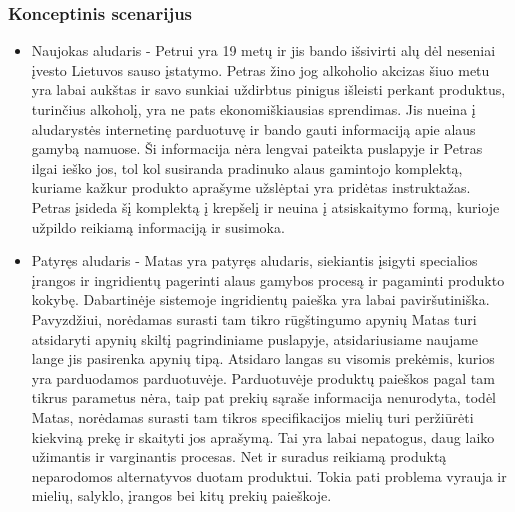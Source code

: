 \documentclass[oneside]{VUMIFPSkursinis}
\begin{document}
		\subsubsection{Konceptinis scenarijus}
			\begin{itemize}
				\item{Naujokas aludaris - Petrui yra 19 metų ir jis bando išsivirti alų dėl neseniai įvesto Lietuvos sauso įstatymo.
					Petras žino jog alkoholio akcizas šiuo metu yra labai aukštas ir savo sunkiai uždirbtus pinigus išleisti perkant produktus, turinčius alkoholį, yra ne pats ekonomiškiausias sprendimas.
					Jis nueina į aludarystės internetinę parduotuvę ir bando gauti informaciją apie alaus gamybą namuose.
					Ši informacija nėra lengvai pateikta puslapyje ir Petras ilgai ieško jos, tol kol susiranda pradinuko alaus gamintojo komplektą, kuriame kažkur produkto aprašyme užslėptai yra pridėtas instruktažas.
					Petras įsideda šį komplektą į krepšelį ir neuina į atsiskaitymo formą, kurioje užpildo reikiamą informaciją ir susimoka.}
				\item{Patyręs aludaris - Matas yra patyręs aludaris, siekiantis įsigyti specialios įrangos ir ingridientų pagerinti alaus gamybos procesą ir pagaminti produkto kokybę.
					Dabartinėje sistemoje ingridientų paieška yra labai paviršutiniška.
					Pavyzdžiui, norėdamas surasti tam tikro rūgštingumo apynių Matas turi atsidaryti apynių skiltį pagrindiniame puslapyje, atsidariusiame naujame lange jis pasirenka apynių tipą.
					Atsidaro langas su visomis prekėmis, kurios yra parduodamos parduotuvėje.
					Parduotuvėje produktų paieškos pagal tam tikrus parametus nėra, taip pat prekių sąraše informacija nenurodyta, todėl Matas, norėdamas surasti tam tikros specifikacijos mielių turi peržiūrėti kiekviną prekę ir skaityti jos aprašymą.
					Tai yra labai nepatogus, daug laiko užimantis ir varginantis procesas.
					Net ir suradus reikiamą produktą neparodomos alternatyvos duotam produktui.
					Tokia pati problema vyrauja ir mielių, salyklo, įrangos bei kitų prekių paieškoje. }
			\end{itemize}
\end{document}
